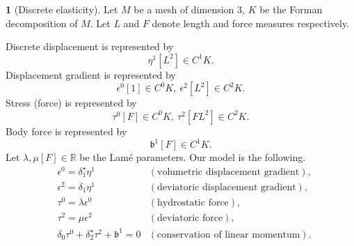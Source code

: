 \documentclass[fleqn]{article}
\theoremstyle{definition}
\newtheorem{discussion}[theorem]{}
\newcommand{\R}{\mathbb{R}}
\begin{document}
\begin{discussion}[Discrete elasticity]
  Let $M$ be a mesh of dimension $3$, $K$ be the Forman decomposition of $M$.
  Let $L$ and $F$ denote length and force measures respectively.
  
  Discrete displacement is represented by
  \begin{equation}
    \eta^1 [L^2] \in C^1 K.
  \end{equation}
  Displacement gradient is represented by
  \begin{equation}
    \epsilon^0 [1] \in C^0 K,\ \epsilon^2 [L^2] \in C^2 K.
  \end{equation}
  Stress (force) is represented by
  \begin{equation}
    \tau^0 [F] \in C^0 K,\ \tau^2 [F L^2] \in C^2 K.
  \end{equation}
  Body force is represented by
  \begin{equation}
    \mathfrak{b}^1 [F] \in C^1 K.
  \end{equation}
  Let $\lambda, \mu [F] \in \R$ be the Lam{\'e} parameters.
  Our model is the following.
  \begin{subequations}
    \begin{align}
      & \epsilon^0 = \delta_1^\star \eta^1
      & (\text{volumetric displacement gradient}), \\
      & \epsilon^2 = \delta_1 \eta^1 
      & (\text{deviatoric displacement gradient}), \\
      & \tau^0 = \lambda \epsilon^0
      & (\text{hydrostatic force}), \\
      & \tau^2 = \mu \epsilon^2
      & (\text{deviatoric force}), \\
      & \delta_0 \tau^0 + \delta_2^\star \tau^2 + \mathfrak{b}^1 = 0
      & (\text{conservation of linear momentum}).
    \end{align}
  \end{subequations}
\end{discussion}
\end{document}
